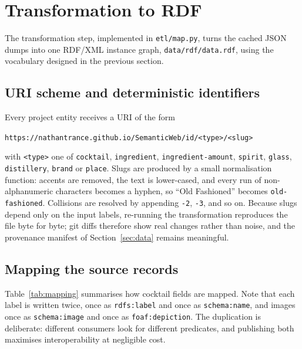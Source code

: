 \section{Transformation to RDF}
\label{sec:transformation}

The transformation step, implemented in \texttt{etl/map.py}, turns the cached
JSON dumps into one RDF/XML instance graph, \texttt{data/rdf/data.rdf}, using
the vocabulary designed in the previous section.

\subsection{URI scheme and deterministic identifiers}

Every project entity receives a URI of the form

\begin{center}
\texttt{https://nathantrance.github.io/SemanticWeb/id/<type>/<slug>}
\end{center}

with \texttt{<type>} one of \texttt{cocktail}, \texttt{ingredient},
\texttt{ingredient-amount}, \texttt{spirit}, \texttt{glass},
\texttt{distillery}, \texttt{brand} or \texttt{place}. Slugs are produced by a
small normalisation function: accents are removed, the text is lower-cased,
and every run of non-alphanumeric characters becomes a hyphen, so
``Old Fashioned'' becomes \texttt{old-fashioned}. Collisions are resolved by
appending \texttt{-2}, \texttt{-3}, and so on. Because slugs depend only on the
input labels, re-running the transformation reproduces the file byte for byte;
git diffs therefore show real changes rather than noise, and the provenance
manifest of Section~\ref{sec:data} remains meaningful.

\subsection{Mapping the source records}

Table~\ref{tab:mapping} summarises how cocktail fields are mapped. Note that
each label is written twice, once as \texttt{rdfs:label} and once as
\texttt{schema:name}, and images once as \texttt{schema:image} and once as
\texttt{foaf:depiction}. The duplication is deliberate: different consumers
look for different predicates, and publishing both maximises interoperability
at negligible cost.

